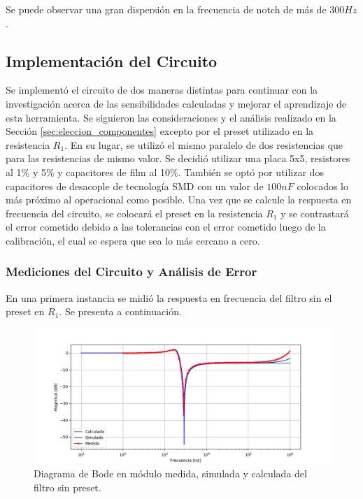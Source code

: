 Se puede observar una gran dispersión en la frecuencia de notch de más de $300Hz$.

\subsection{Implementación del Circuito}
Se implementó el circuito de dos maneras distintas para continuar con la investigación acerca de las sensibilidades calculadas y mejorar el aprendizaje de esta herramienta. Se siguieron las consideraciones y el análisis realizado en la Sección \ref{sec:eleccion_componentes} excepto por el preset utilizado en la resistencia $R_1$. En su lugar, se utilizó el mismo paralelo de dos resistencias que para las resistencias de mismo valor. Se decidió utilizar una placa 5x5, resistores al 1\% y 5\% y capacitores de film al 10\%. También se optó por utilizar dos capacitores de desacople de tecnología SMD con un valor de $100nF$ colocados lo más próximo al operacional como posible. Una vez que se calcule la respuesta en frecuencia del circuito, se colocará el preset en la resistencia $R_1$ y se contrastará el error cometido debido a las tolerancias con el error cometido luego de la calibración, el cual se espera que sea lo más cercano a cero.
\subsubsection{Mediciones del Circuito y Análisis de Error}
\label{sec:mediciones}

En una primera instancia se midió la respuesta en frecuencia del filtro sin el preset en $R_1$. Se presenta a continuación.

\begin{figure}[H]
	\centering
	\includegraphics[width=\textwidth]{Imagenes1/bode_calc_sim_med.PNG}
	\caption{Diagrama de Bode en módulo medida, simulada y calculada del filtro sin preset.}
	\label{fig:bode_calc_sim_med}
\end{figure}

